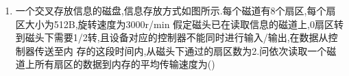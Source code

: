 \documentclass[12pt, a4paper, oneside, UTF8]{ctexbook}
\begin{document}
\begin{enumerate}
    \item 一个交叉存放信息的磁盘,信息存放方式如图所示.每个磁道有8个扇区,每个扇区大小为512B,旋转速度为3000r/min
    假定磁头已在读取信息的磁道上,0扇区转到磁头下需要1/2转,且设备对应的控制器不能同时进行输入/输出,在数据从控制器传送至内
    存的这段时间内,从磁头下通过的扇区数为2.问依次读取一个磁道上所有扇区的数据到内存的平均传输速度为(\qquad)
    \begin{center}
    \end{center}
\end{enumerate}
\ifx\allfiles\undefined
\end{document}
